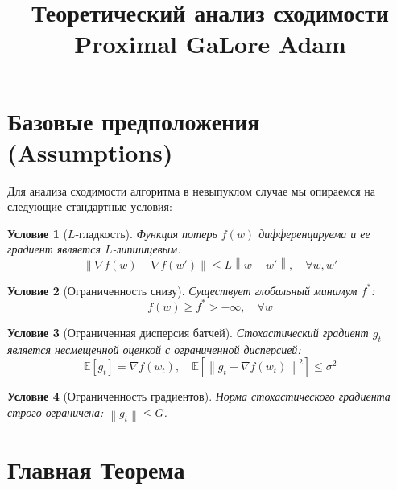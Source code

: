 \documentclass[11pt]{article}
\newtheorem{assumption}{Условие}
\newcommand{\E}{\mathbb{E}}
\newcommand{\norm}[1]{\left\|#1\right\|}
\begin{document}

\title{\textbf{Теоретический анализ сходимости Proximal GaLore Adam}}
\author{}
\date{}
\maketitle

\section{Базовые предположения (Assumptions)}

Для анализа сходимости алгоритма в невыпуклом случае мы опираемся на следующие стандартные условия:

\begin{assumption}[$L$-гладкость]
\label{assum:smoothness}
Функция потерь $f(w)$ дифференцируема и ее градиент является $L$-липшицевым:
\begin{equation}
    \norm{\nabla f(w) - \nabla f(w')} \le L \norm{w - w'}, \quad \forall w, w'
\end{equation}
\end{assumption}

\begin{assumption}[Ограниченность снизу]
\label{assum:bounded_below}
Существует глобальный минимум $f^*$:
\begin{equation}
    f(w) \ge f^* > -\infty, \quad \forall w
\end{equation}
\end{assumption}

\begin{assumption}[Ограниченная дисперсия батчей]
\label{assum:variance}
Стохастический градиент $g_t$ является несмещенной оценкой с ограниченной дисперсией:
\begin{equation}
    \E[g_t] = \nabla f(w_t), \quad \E[\norm{g_t - \nabla f(w_t)}^2] \le \sigma^2
\end{equation}
\end{assumption}

\begin{assumption}[Ограниченность градиентов]
\label{assum:bounded_gradients}
Норма стохастического градиента строго ограничена: $\norm{g_t} \le G$.
\end{assumption}

\section{Главная Теорема}
\end{document}

